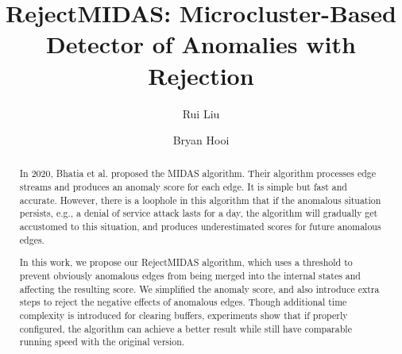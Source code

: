 \documentclass[5p]{elsarticle}
\begin{document}
	\begin{frontmatter}

		\title{RejectMIDAS: Microcluster-Based Detector of Anomalies with Rejection}





		\author[1]{Rui Liu}

		\author[1]{Bryan Hooi}


		\address[1]{School of Computing, National University of Singapore, Singapore}

		\begin{abstract}
			In 2020, Bhatia et al. proposed the MIDAS algorithm. Their algorithm processes edge streams and produces an anomaly score for each edge. It is simple but fast and accurate. However, there is a loophole in this algorithm that if the anomalous situation persists, e.g., a denial of service attack lasts for a day, the algorithm will gradually get accustomed to this situation, and produces underestimated scores for future anomalous edges.

			In this work, we propose our RejectMIDAS algorithm, which uses a threshold to prevent obviously anomalous edges from being merged into the internal states and affecting the resulting score. We simplified the anomaly score, and also introduce extra steps to reject the negative effects of anomalous edges. Though additional time complexity is introduced for clearing buffers, experiments show that if properly configured, the algorithm can achieve a better result while still have comparable running speed with the original version.

		\end{abstract}


	\end{frontmatter}
\end{document}
